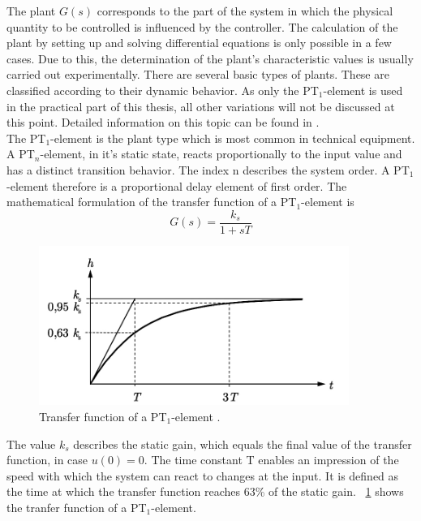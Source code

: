 The plant $G(s)$ corresponds to the part of the system in which the physical quantity to be controlled is influenced by the controller. The calculation of the plant by setting up and solving differential equations is only possible in a few cases. Due to this, the determination of the plant's characteristic values is usually carried out experimentally. There are several basic types of plants. These are classified according to their dynamic behavior. As only the PT$_{1}$-element is used in the practical part of this thesis, all other variations will not be discussed at this point. Detailed information on this topic can be found in \cite{Reg_10}.
\\The PT$_{1}$-element is the plant type which is most common in technical equipment. A PT$_{n}$-element, in it's static state, reacts proportionally to the input value and has a distinct transition behavior. The index n describes the system order. A PT$_{1}$-element therefore is a proportional delay element of first order. The mathematical formulation of the transfer function of a PT$_{1}$-element is
\begin{equation}
    G(s) = \frac{k_{s}}{1+sT}
 \label{eq:tf_pt1}
\end{equation}

\begin{figure}[h]
   \centering
   \includegraphics[width=0.9\textwidth]{images/tf_pt1.jpg}
   \caption[Tranfer function of a PT$_{1}$-element]{Transfer function of a PT$_{1}$-element \cite{Reg_10}.}
   \label{fig:tf_pt1}
 \end{figure}
The value $k_{s}$ describes the static gain, which equals the final value of the transfer function, in case $u(0)=0$. The time constant T enables an impression of the speed with which the system can react to changes at the input. It is defined as the time at which the transfer function reaches 63\% of the static gain. \cite{Reg_10}
\figurename~\ref{fig:tf_pt1} shows the tranfer function of a PT$_{1}$-element.


